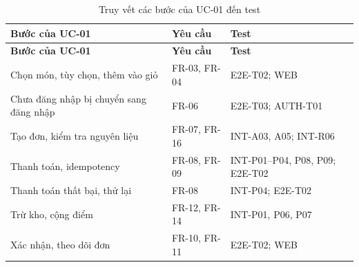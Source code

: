 {\small
\begin{longtable}{@{}L{5.4cm}L{2.6cm}L{5.9cm}@{}}
\caption{Truy vết các bước của UC-01 đến test}\label{tab:tvuc}\\
\toprule
\textbf{Bước của UC-01} & \textbf{Yêu cầu} & \textbf{Test} \\ \midrule \endfirsthead
\toprule \textbf{Bước của UC-01} & \textbf{Yêu cầu} & \textbf{Test} \\ \midrule \endhead
\bottomrule \endfoot
Chọn món, tùy chọn, thêm vào giỏ & FR-03, FR-04 & E2E-T02; WEB  \\
Chưa đăng nhập bị chuyển sang đăng nhập & FR-06 & E2E-T03; AUTH-T01 \\
Tạo đơn, kiểm tra nguyên liệu & FR-07, FR-16 & INT-A03, A05; INT-R06 \\
Thanh toán, idempotency & FR-08, FR-09 & INT-P01--P04, P08, P09; E2E-T02 \\
Thanh toán thất bại, thử lại & FR-08 & INT-P04; E2E-T02 \\
Trừ kho, cộng điểm & FR-12, FR-14 & INT-P01, P06, P07 \\
Xác nhận, theo dõi đơn & FR-10, FR-11 & E2E-T02; WEB  \\
\end{longtable}
}